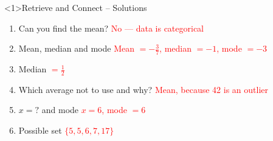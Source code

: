 \documentclass{beamer}
\begin{document}
\begin{frame}<1>{Retrieve and Connect -- Solutions}
\vspace{-0.8em}

\footnotesize
\begin{enumerate}\itemsep2pt
  \item Can you find the mean?  
        \textcolor{red}{No — data is categorical}
  \item Mean, median and mode  
        \textcolor{red}{Mean $=-\frac{3}{7}$, median $=-1$, mode $=-3$}
  \item Median  
        \textcolor{red}{$=\frac{1}{2}$}
  \item Which average not to use and why?  
        \textcolor{red}{Mean, because 42 is an outlier}
  \item $x=?$ and mode  
        \textcolor{red}{$x=6$, mode $=6$}
  \item Possible set  
        \textcolor{red}{$\{5,5,6,7,17\}$}
\end{enumerate}
\end{frame}
\end{document}
